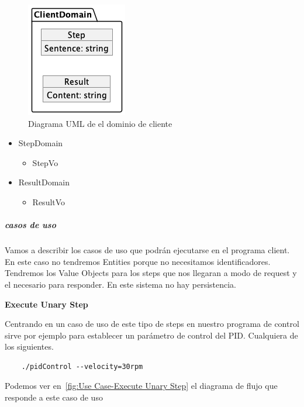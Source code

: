 \begin{figure}[H]
    \centering
    \includegraphics[height=0.2\textheight]{./part/Proyecto_ejecutivo/memoria_descriptiva/descripcionDelProyecto/client/uml/clientDomain}
    \caption{Diagrama UML de el dominio de cliente}\label{fig:Diagrama UML de el dominio de cliente}
\end{figure}

\begin{itemize}
    \item StepDomain
    \begin{itemize}
        \item StepVo
    \end{itemize}
    \item ResultDomain
    \begin{itemize}
        \item ResultVo
    \end{itemize}
\end{itemize}

\subparagraph{casos de uso}

Vamos a describir los casos de uso que podrán ejecutarse en el programa client. En este caso no tendremos Entities porque no necesitamos identificadores.
Tendremos los Value Objects para los steps que nos llegaran a modo de request y el necesario para responder. En este sistema no hay persistencia.

\textbf{Execute Unary Step}

Centrando en un caso de uso de este tipo de steps en nuestro programa de control sirve por ejemplo para establecer un parámetro de control del PID. Cualquiera de los siguientes.
\begin{verbatim}
    ./pidControl --velocity=30rpm
\end{verbatim}

Podemos ver en~\cref{fig:Use Case-Execute Unary Step} el diagrama de flujo que responde a este caso de uso

